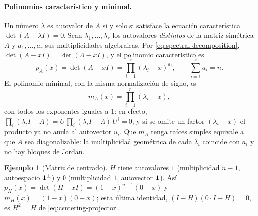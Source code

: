 \documentclass[11pt,a4paper]{article}
\newcommand{\dg}{\dagger}                         %
\theoremstyle{plain}
\theoremstyle{definition}
\newtheorem{ejemplo}[teorema]{Ejemplo}
\theoremstyle{remark}
\numberwithin{equation}{section}
\begin{document}
\paragraph{Polinomios característico y minimal.} Un número $\lambda$ es autovalor de $A$ si y
solo si satisface la ecuación característica $\det(A-\lambda I)=0$. Sean
$\lambda_1,\dots,\lambda_r$ los autovalores \emph{distintos} de la matriz simétrica $A$ y
$a_1,\dots,a_r$ sus multiplicidades algebraicas. Por \eqref{eq:spectral-decomposition},
$\det(A-xI)=\det(\Lambda-xI)$, y el polinomio característico es
\begin{equation}\label{eq:char-poly}
  p_A(x)=\det(A-xI)=\prod_{i=1}^r(\lambda_i-x)^{a_i},\qquad\sum_{i=1}^ra_i=n .
\end{equation}
El polinomio minimal, con la misma normalización de signo, es
\begin{equation}\label{eq:min-poly}
  m_A(x)=\prod_{i=1}^r(\lambda_i-x) ,
\end{equation}
con todos los exponentes iguales a $1$: en efecto,
$\prod_i(\lambda_iI-A)=U\,\prod_i(\lambda_iI-\Lambda)\,U^{\dg}=0$, y si se omite un factor
$(\lambda_i-x)$ el producto ya no anula al autovector $u_i$. Que $m_A$ tenga raíces simples
equivale a que $A$ sea diagonalizable: la multiplicidad geométrica de cada $\lambda_i$
coincide con $a_i$ y no hay bloques de Jordan.

\begin{ejemplo}[Matriz de centrado]
$H$ tiene autovalores $1$ (multiplicidad $n-1$, autoespacio $\mathbf{1}^{\perp}$) y $0$
(multiplicidad $1$, autovector $\mathbf{1}$). Así
$p_H(x)=\det(H-xI)=(1-x)^{n-1}(0-x)$ y $m_H(x)=(1-x)(0-x)$; esta última identidad,
$(I-H)(0\cdot I-H)=0$, es $H^2=H$ de \eqref{eq:centering-projector}.
\end{ejemplo}
\end{document}
